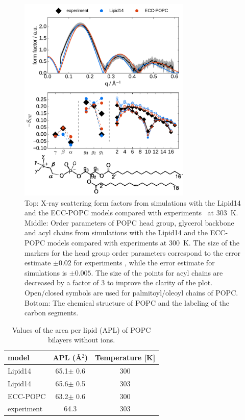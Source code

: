 \documentclass[journal=jpcbfk,manuscript=article]{achemso}
\begin{document}
\begin{figure}[tb!]
  \centering
  \includegraphics[width=8.2cm]{../Fig/ipython_nb/Order-parameters_form-factors_exp-L14-ECCL17_q80_sig89_POPC-struct.pdf}
  \caption{\label{simVSexpNOions}
    Top: X-ray scattering form factors from simulations with the Lipid14 \cite{dickson14} and
    the ECC-POPC models compared with experiments~\cite{kucerka11} at 303~K. \\
    Middle: Order parameters of POPC head group, glycerol backbone and acyl chains 
    from simulations with the Lipid14 \cite{dickson14} and the ECC-POPC models
    compared with experiments \cite{ferreira13} at 300~K.
    The size of the markers for the head group order parameters correspond to
    the error estimate $\pm 0.02$ for experiments \cite{botan15,ollila16},
    while the error estimate for simulations is $\pm 0.005$.
    The size of the points for acyl chains are decreased by a factor of 3 to improve the clarity of the plot.
    Open/closed symbols are used for palmitoyl/oleoyl chains of POPC. \\
    Bottom: The chemical structure of POPC and the labeling of the carbon segments.
  } 
\end{figure}

\begin{table}[tb!]
  \caption{Values of the area per lipid (APL) of POPC bilayers without ions. \label{tab:apls}
  }
  \begin{tabular}{l|c c}
    model          & APL (\AA$^2$)   & Temperature [K] \\
    \hline
    Lipid14                   & 65.1$\pm$ 0.6  &  300 \\
    Lipid14 \cite{dickson14}  & 65.6$\pm$ 0.5  &  303 \\
    \hline
    ECC-POPC                & 63.2$\pm$ 0.6  &  300       \\
    \hline
    experiment \cite{kucerka11} & 64.3  &  303    \\
    \hline
  \end{tabular}
\end{table}
\end{document}
